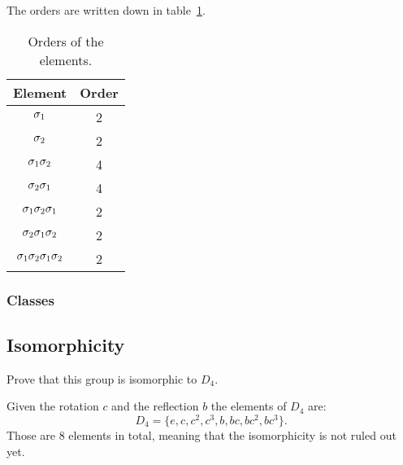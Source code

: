\documentclass[11pt, english, fleqn, DIV=15, headinclude, BCOR=1cm]{scrartcl}
\begin{document}
The orders are written down in table~\ref{tab:orders}.

\begin{table}[htbp]
    \centering
    \begin{tabular}{cc}
        Element & Order \\
        \midrule
        $\sigma_1$ & 2 \\
        $\sigma_2$ & 2 \\
        $\sigma_1\sigma_2$ & 4 \\
        $\sigma_2\sigma_1$ & 4 \\
        $\sigma_1\sigma_2\sigma_1$ & 2 \\
        $\sigma_2\sigma_1\sigma_2$ & 2 \\
        $\sigma_1\sigma_2\sigma_1\sigma_2$ & 2
    \end{tabular}
    \caption{%
        Orders of the elements.
    }
    \label{tab:orders}
\end{table}

\subsubsection{Classes}


\subsection{Isomorphicity}

\begin{problem}
    Prove that this group is isomorphic to $D_4$.
\end{problem}

Given the rotation $c$ and the reflection $b$ the elements of $D_4$ are:
\[
    D_4 = \{ e, c, c^2, c^3, b, bc, bc^2, bc^3 \}.
\]
Those are 8 elements in total, meaning that the isomorphicity is not ruled out
yet.
\end{document}
